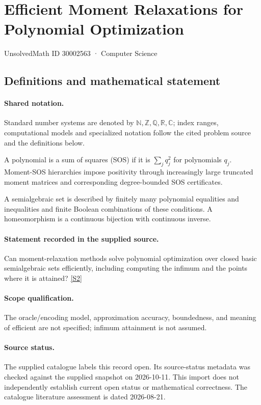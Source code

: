 \documentclass[11pt]{article}
\newcommand{\sref}[2]{\hyperlink{source:#1:#2}{[S#2]}}
\begin{document}
\setcounter{section}{30002562}
\section{Efficient Moment Relaxations for Polynomial Optimization}\label{30002563}
{\small\sffamily UnsolvedMath ID 30002563 · Computer Science}
\subsection{Definitions and mathematical statement}

\paragraph{Shared notation.}Standard number systems are denoted by $\mathbb N,\mathbb Z,\mathbb Q,\mathbb R,\mathbb C$; index ranges, computational models and specialized notation follow the cited problem source and the definitions below.


A polynomial is a sum of squares (SOS) if it is $\sum_j q_j^2$ for polynomials $q_j$. Moment-SOS hierarchies impose positivity through increasingly large truncated moment matrices and corresponding degree-bounded SOS certificates.

A semialgebraic set is described by finitely many polynomial equalities and inequalities and finite Boolean combinations of these conditions. A homeomorphism is a continuous bijection with continuous inverse.
\paragraph{Statement recorded in the supplied source.}
Can moment-relaxation methods solve polynomial optimization over closed basic semialgebraic sets efficiently, including computing the infimum and the points where it is attained? \sref{30002563}{2}
\paragraph{Scope qualification.}
The oracle/encoding model, approximation accuracy, boundedness, and meaning of efficient are not specified; infimum attainment is not assumed.
\paragraph{Source status.}
The supplied catalogue labels this record open. Its source-status metadata was checked against the supplied snapshot on 2026-10-11. This import does not independently establish current open status or mathematical correctness. The catalogue literature assessment is dated 2026-08-21.
\end{document}
